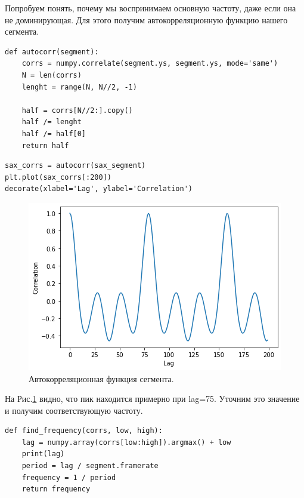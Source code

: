\documentclass[a4paper, 14pt]{extarticle}
\begin{document}
    Попробуем понять, почему мы воспринимаем основную частоту, даже если она не доминирующая.
    Для этого получим автокорреляционную функцию нашего сегмента.

    \begin{lstlisting}[caption= Функция для получения автокорреляции., label={lst:task4_fun_autocorr}]
def autocorr(segment):
    corrs = numpy.correlate(segment.ys, segment.ys, mode='same')
    N = len(corrs)
    lenght = range(N, N//2, -1)

    half = corrs[N//2:].copy()
    half /= lenght
    half /= half[0]
    return half     \end{lstlisting}

    \begin{lstlisting}[caption= Получение автокорреляционной функции выбранного сегмента., label={lst:task4_autocorr}]
sax_corrs = autocorr(sax_segment)
plt.plot(sax_corrs[:200])
decorate(xlabel='Lag', ylabel='Correlation')    \end{lstlisting}

    \begin{figure}[h]
        \centering
        \includegraphics[width=0.7\linewidth]{resources/Images/task4_autocorr}
        \caption{Автокорреляционная функция сегмента.}
        \label{fig:task4_autocorr}
    \end{figure}

    На Рис.\ref{fig:task4_autocorr} видно, что пик находится примерно при lag=75. Уточним это значение и получим
    соответствующую частоту.

    \begin{lstlisting}[caption= Функция для поиска самой высокой корреляции и её частоты., label={lst:task4_fun_find}]
def find_frequency(corrs, low, high):
    lag = numpy.array(corrs[low:high]).argmax() + low
    print(lag)
    period = lag / segment.framerate
    frequency = 1 / period
    return frequency    \end{lstlisting}
\end{document}
